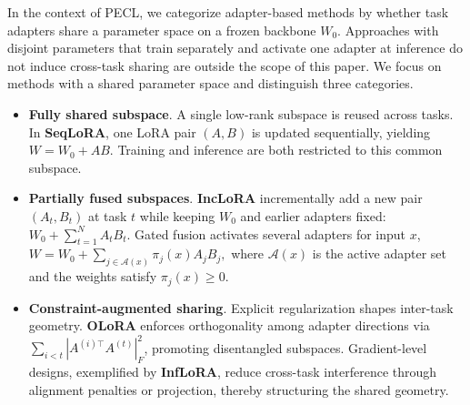 \documentclass{article} %
\begin{document}
In the context of PECL, we categorize adapter-based methods by whether task adapters share a parameter space on a frozen backbone $W_0$. Approaches with disjoint parameters that train separately and activate one adapter at inference do not induce cross-task sharing are outside the scope of this paper. We focus on methods with a shared parameter space and distinguish three categories.

\begin{itemize}
    \item  \textbf{Fully shared subspace}. A single low-rank subspace is reused across tasks. In \textbf{SeqLoRA}, one LoRA pair $(A,B)$ is updated sequentially, yielding $W = W_0 + AB .$ Training and inference are both restricted to this common subspace.
    \item  \textbf{Partially fused subspaces}. \textbf{IncLoRA} incrementally add a new pair $(A_t,B_t)$ at task $t$ while keeping $W_0$ and earlier adapters fixed:  $W_0 + \sum_{t=1}^N A_t B_t$.  Gated fusion activates several adapters for input $x$, $W = W_0 + \sum_{j \in \mathcal{A}(x)} \pi_j(x) A_j B_j ,$ where $\mathcal{A}(x)$ is the active adapter set and the weights satisfy $\pi_j(x)\ge 0$\cite{Yu_2024_CVPR,zhao-etal-2024-sapt,cheng2025exploiting}.
 
    \item  \textbf{Constraint-augmented sharing}. Explicit regularization shapes inter-task geometry. \textbf{OLoRA}\cite{wang2023orthogonal} enforces orthogonality among adapter directions via $\sum_{i<t}|A^{(i)\top}A^{(t)}|_F^2$, promoting disentangled subspaces. Gradient-level designs, exemplified by \textbf{InfLoRA}\cite{Liang_2024_CVPR}, reduce cross-task interference through alignment penalties or projection, thereby structuring the shared geometry.
\end{itemize}




\end{document}
